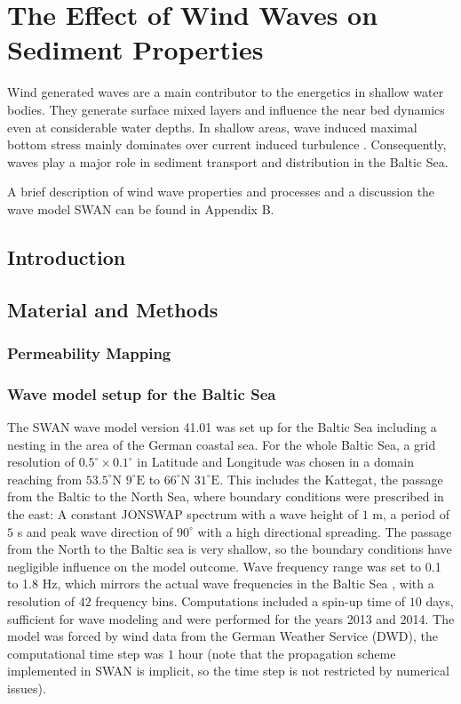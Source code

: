 \chapter{The Effect of Wind Waves on Sediment Properties}
\label{kap-waves}

Wind generated waves are a main contributor to the energetics in shallow water 
bodies. They generate surface mixed layers and influence the near bed dynamics 
even at considerable water depths. In shallow areas, wave induced maximal 
bottom stress mainly dominates over current induced turbulence 
\citep[][]{jonsson2004}. Consequently, waves play a major role in sediment 
transport and distribution in the Baltic Sea.

A brief description of wind wave properties and processes and a discussion the 
wave model SWAN can be found in Appendix B.

\section{Introduction}

\section{Material and Methods}

\subsection{Permeability Mapping}

\subsection{Wave model setup for the Baltic Sea}\label{balticswan}

The SWAN wave model version 41.01 was set up for the Baltic Sea including a 
nesting in the area of the German coastal sea. For the whole Baltic Sea, a grid 
resolution of $0.5^\circ \times 0.1^\circ $ in Latitude and Longitude was chosen 
in a domain reaching from $53.5^\circ \text{N } 9^\circ \text{E}$ to $66^\circ 
\text{N } 31^\circ \text{E}$. This includes the Kattegat, the passage from the 
Baltic to the North Sea, where boundary conditions were prescribed in the east: 
A constant JONSWAP spectrum with a wave height of $1$ m, a period of $5$ s and 
peak wave direction of $90^\circ$ with a high directional spreading. The passage 
from the North to the Baltic sea is very shallow, so the boundary conditions 
have negligible influence on the model outcome. Wave frequency range was set to 
0.1 to 1.8 Hz, which mirrors the actual wave frequencies in the Baltic 
Sea \citep[][]{balticsea}, with a resolution of $42$ frequency bins. 
Computations included a spin-up time of $10$ days, sufficient for wave modeling 
and were performed for the years 2013 and 2014. The model was forced by wind 
data from the German Weather Service (DWD), the computational time step was $1$ 
hour (note that the propagation scheme implemented in SWAN is implicit, so the 
time step is not restricted by numerical issues). 

